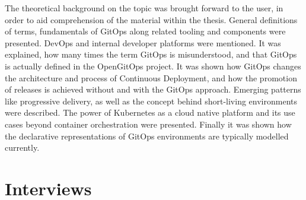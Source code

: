 The theoretical background on the topic was brought forward to the user,
in order to aid comprehension of the material within the thesis.
General definitions of terms,
fundamentals of GitOps along related tooling and components were presented.
DevOps and internal developer platforms were mentioned.
It was explained, how many times the term GitOps is misunderstood,
and that GitOps is actually defined in the OpenGitOps project.
It was shown how GitOps changes the architecture and process of Continuous Deployment,
and how the promotion of releases is achieved without and with the GitOps approach.
Emerging patterns like progressive delivery,
as well as the concept behind short-living environments were described.
The power of Kubernetes as a cloud native platform and its use cases beyond container orchestration were presented.
Finally it was shown how the declarative representations of GitOps environments are typically modelled currently.

\section*{Interviews}

